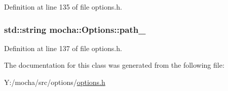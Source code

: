 Definition at line 135 of file options.h.

\hypertarget{classmocha_1_1_options_acecff880bcf3d91590fa39665c2ec6ab}{
\subsubsection[{path\_\-}]{\setlength{\rightskip}{0pt plus 5cm}std::string {\bf mocha::Options::path\_\-}}}
\label{classmocha_1_1_options_acecff880bcf3d91590fa39665c2ec6ab}


Definition at line 137 of file options.h.



The documentation for this class was generated from the following file:\begin{DoxyCompactItemize}
\item 
Y:/mocha/src/options/\hyperlink{options_8h}{options.h}\end{DoxyCompactItemize}
